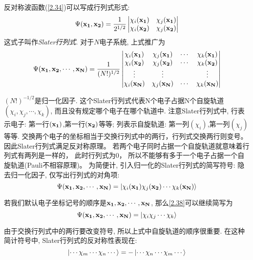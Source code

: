 反对称波函数(\ref{2.34})可以写成行列式形式:
\begin{equation}
\Psi(\mathbf{x_1,x_2})=\frac{1}{2^{1/2}}
\begin{vmatrix}
\chi_i(\mathbf{x_1})&\chi_j(\mathbf{x_1})\\
\chi_i(\mathbf{x_2})&\chi_j(\mathbf{x_2})
\end{vmatrix}
\end{equation}
这式子叫作\emph{Slater行列式}.
对于$N$电子系统, 
上式推广为
\begin{equation}
\Psi(\mathbf{x_1,x_2,\cdots,x_N})=\frac{1}{(N!)^{1/2}}
\begin{vmatrix}
\chi_i(\mathbf{x_1})&\chi_j(\mathbf{x_1})&\cdots&\chi_k(\mathbf{x_1})\\
\chi_i(\mathbf{x_2})&\chi_j(\mathbf{x_2})&\cdots&\chi_k(\mathbf{x_2})\\
\vdots			&\vdots			& \,&\vdots\\
\chi_i(\mathbf{x_N})&\chi_j(\mathbf{x_N})&\cdots&\chi_k(\mathbf{x_N})
\end{vmatrix}
\end{equation}

$(N!)^{-1/2}$是归一化因子. 
这个Slater行列式代表N个电子占据N个自旋轨道$(\chi_i,\chi_j,\cdots,\chi_k)$, 
而且没有规定哪个电子在哪个轨道中. 
注意Slater行列式中, 行表示电子: 第一行$(\mathbf{x_1})$,第一行$(\mathbf{x_2})$等等; 
列表示自旋轨道: 第一列$(\chi_i)$,第一列$(\chi_j)$等等. 
交换两个电子的坐标相当于交换行列式中的两行，行列式交换两行则变号。
因此Slater行列式满足反对称原理。
若两个电子同时占据一个自旋轨道就意味着行列式有两列是一样的，
此时行列式为$0$，
所以不能够有多于一个电子占据一个自旋轨道(Pauli不相容原理)。
为简便计, 引入归一化的Slater行列式的简写符号: 隐去归一化因子, 仅写出行列式的对角项:
\begin{equation}
\label{2.38}
\Psi(\mathbf{x_1,x_2,\cdots,x_N})=\Ket{\chi_i(\mathbf{x_1})\chi_j(\mathbf{x_2})\cdots\chi_k(\mathbf{x_N})}
\end{equation}

若我们默认电子坐标记号的顺序是$\mathbf{x_1,x_2,\cdots,x_N}$, 
那么\ref{2.38}可以继续简写为
\begin{equation}
\Psi(\mathbf{x_1,x_2,\cdots,x_N})=\Ket{\chi_i\chi_j\cdots\chi_k}
\end{equation}

由于交换行列式中的两行要改变符号, 
所以上式中自旋轨道的顺序很重要. 
在这种简计符号中, 
Slater行列式的反对称性表现在:
\begin{equation}
\Ket{\cdots\chi_m\cdots\chi_n\cdots}=-\Ket{\cdots\chi_n\cdots\chi_m\cdots}
\end{equation}

